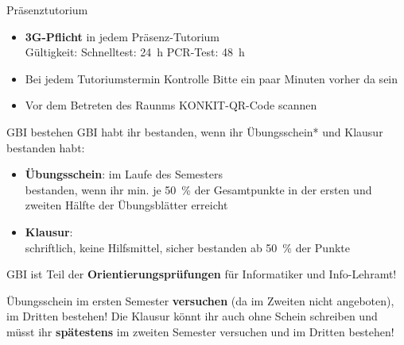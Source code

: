 
\begin{frame}[t]{Präsenztutorium}
	\begin{itemize}
		\item \textbf{3G-Pflicht} in jedem Präsenz-Tutorium \\
			Gültigkeit: \quad Schnelltest: 24~h \quad PCR-Test: 48~h
		\item Bei jedem Tutoriumstermin Kontrolle 
		\implitem Bitte ein paar Minuten vorher da sein
		\item Vor dem Betreten des Raunms KONKIT-QR-Code scannen
	\end{itemize}
\end{frame}


\begin{frame}[t]{GBI bestehen}
	GBI habt ihr bestanden, wenn ihr Übungsschein* und Klausur bestanden habt:
	\begin{itemize}
		\item \textbf{Übungsschein}: im Laufe des Semesters \\
			  bestanden, wenn ihr min. je 50~\% der Gesamtpunkte in der ersten und zweiten Hälfte der Übungsblätter erreicht \\

		\item \textbf{Klausur}: \Klausurtermin \\
			  schriftlich, keine Hilfsmittel, sicher bestanden ab 50~\% der Punkte
	\end{itemize}
	\pause
	\pause
	GBI ist Teil der \textbf{Orientierungsprüfungen} für Informatiker und Info-Lehramt!
	\begin{itemize}
		\implitem Übungsschein im ersten Semester \textbf{versuchen} (da im Zweiten nicht angeboten), im Dritten bestehen! 
		\implitem Die Klausur könnt ihr auch ohne Schein schreiben und müsst ihr \textbf{spätestens} im zweiten Semester versuchen und im Dritten bestehen!
	\end{itemize}
\end{frame}

